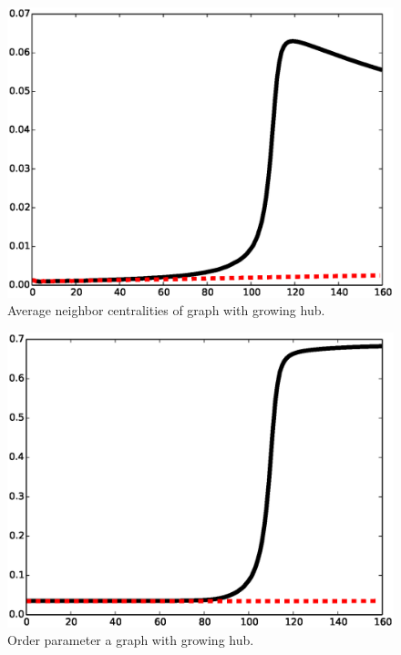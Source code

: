 \documentclass[twocolumn,prl,superscriptaddress]{revtex4}
\begin{document}
\begin{figure}
\begin{center}
\includegraphics[width=\columnwidth]{nb.eps}
\end{center}
\caption{Average neighbor centralities of graph with growing hub.}
\label{fig:neighbor}
\end{figure}

\begin{figure}
\begin{center}
\includegraphics[width=\columnwidth]{op.eps}
\end{center}
\caption{Order parameter a graph with growing hub.}
\label{fig:order-parameter}
\end{figure}
\end{document}
